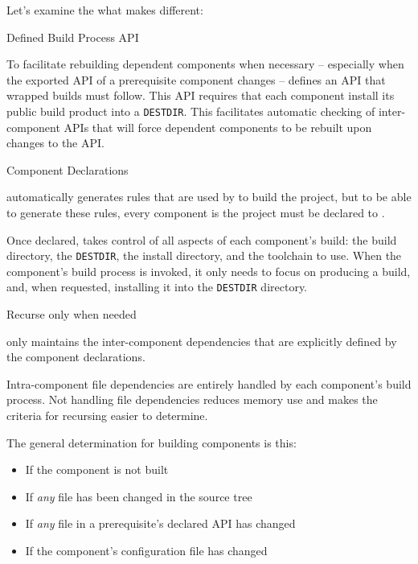 Let's examine the what makes \lmsbw different:

\begin{description}
\item Defined Build Process API

  To facilitate rebuilding dependent components when necessary --
  especially when the exported API of a prerequisite component changes
  -- \lmsbw defines an API that wrapped builds must follow.  This API
  requires that each component install its public build product into a
  \texttt{DESTDIR}.  This facilitates automatic checking of
  inter-component APIs that will force dependent components to be
  rebuilt upon changes to the API.

\item Component Declarations

  \lmsbw automatically generates rules that are used by \make to build
  the project, but to be able to generate these rules, every component
  is the project must be declared to \lmsbw.

  Once declared, \lmsbw takes control of all aspects of each
  component's build: the build directory, the \texttt{DESTDIR}, the
  install directory, and the toolchain to use.  When the component's
  build process is invoked, it only needs to focus on producing a
  build, and, when requested, installing it into the \texttt{DESTDIR}
  directory.

\item Recurse only when needed\label{intro:build-component-criteria}

  \lmsbw only maintains the inter-component dependencies that are
  explicitly defined by the component declarations.

  Intra-component file dependencies are entirely handled by each
  component's build process.  Not handling file dependencies reduces
  memory use and makes the criteria for recursing easier to determine.

  The general determination for building components is this:

  \begin{itemize}
  \item If the component is not built
  \item If \emph{any} file has been changed in the source tree
  \item If \emph{any} file in a prerequisite's declared API has
    changed
  \item If the component's configuration file has changed
  \end{itemize}


\end{description}
